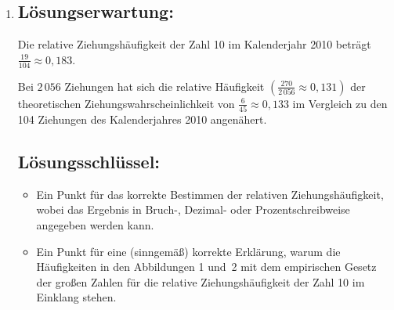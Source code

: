 \begin{langesbeispiel}
{\begin{enumerate}
	\subsubsection{Richtigstellung:}
	\begin{itemize}
		\item  Eine Zahl, die bei einer Lottoziehung gezogen wurde, wird bei der darauffolgenden Lottoziehung mit einer Wahrscheinlichkeit von $\frac{6}{45}$ erneut gezogen.
		\item Im Kalenderjahr 2010 war die Wahrscheinlichkeit, die Zahl 8 zu ziehen, bei jeder Ziehung gleich $\frac{6}{45}$.
		\item Die Wahrscheinlichkeit, dass die Zahl 32 bei einer Ziehung als zweite Zahl gezogen wird, beträgt $\frac{1}{45}$.
	\end{itemize}
	 	
	\subsection{Lösungsschlüssel:}
	\begin{itemize}
		\item  Ein Ausgleichspunkt ist nur dann zu geben, wenn genau zwei Aussagen angekreuzt sind und beide Kreuze richtig gesetzt sind.
		\item Ein Punkt für eine (sinngemäß) korrekte Richtigstellung einer der drei falschen Aussagen.
	\end{itemize}
	
	\item \subsection{Lösungserwartung:}
			
		Die relative Ziehungshäufigkeit der Zahl 10 im Kalenderjahr 2010 beträgt $\frac{19}{104}\approx 0,183$.
		
		Bei $2\,056$ Ziehungen hat sich die relative Häufigkeit $\left(\frac{270}{2\,056}\approx 0,131\right)$ der theoretischen Ziehungswahrscheinlichkeit von $\frac{6}{45}\approx 0,133$ im Vergleich zu den 104 Ziehungen des Kalenderjahres 2010 angenähert.
		
	\subsection{Lösungsschlüssel:}
	
\begin{itemize}
	\item  Ein Punkt für das korrekte Bestimmen der relativen Ziehungshäufigkeit, wobei das Ergebnis in Bruch-, Dezimal- oder Prozentschreibweise angegeben werden kann.
	\item  Ein Punkt für eine (sinngemäß) korrekte Erklärung, warum die Häufigkeiten in den Abbildungen 1 und 2 mit dem empirischen Gesetz der großen Zahlen für die relative Ziehungshäufigkeit der Zahl 10 im Einklang stehen.
\end{itemize}


\end{enumerate}}
\end{langesbeispiel}

